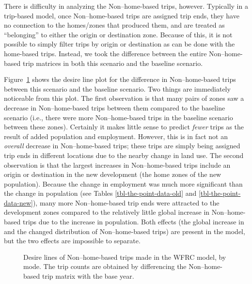 \documentclass[fancy, twoside, mastersfancy, ms]{byuthesis}
\begin{document}
There is difficulty in analyzing the Non--home-based trips, however.
Typically in a trip-based model, once Non--home-based trips are assigned
trip ends, they have no connection to the homes/zones that produced
them, and are treated as ``belonging'' to either the origin or
destination zone. Because of this, it is not possible to simply filter
trips by origin or destination as can be done with the home-based trips.
Instead, we took the difference between the entire Non--home-based trip
matrices in both this scenario and the baseline scenario.

Figure~\ref{fig-lu-desire-cube-nhb} shows the desire line plot for the
difference in Non--home-based trips between this scenario and the
baseline scenario. Two things are immediately noticeable from this plot.
The first observation is that many pairs of zones saw a decrease in
Non--home-based trips between them compared to the baseline scenario
(i.e., there were more Non--home-based trips in the baseline scenario
between these zones). Certainly it makes little sense to predict
\emph{fewer} trips as the result of added population and employment.
However, this is in fact not an \emph{overall} decrease in
Non--home-based trips; these trips are simply being assigned trip ends
in different locations due to the nearby change in land use. The second
observation is that the largest increases in Non--home-based trips
include an origin or destination in the new development (the home zones
of the new population). Because the change in employment was much more
significant than the change in population (see Tables
\ref{tbl-the-point-data-old} and \ref{tbl-the-point-data-new}), many
more Non--home-based trip ends were attracted to the development zones
compared to the relatively little global increase in Non--home-based
trips due to the increase in population. Both effects (the global
increase in and the changed distribution of Non--home-based trips) are
present in the model, but the two effects are impossible to separate.

\begin{figure}


\caption[Desire lines of Non--home-based trips made in the WFRC
model.]{\label{fig-lu-desire-cube-nhb}Desire lines of Non--home-based
trips made in the WFRC model, by mode. The trip counts are obtained by
differencing the Non--home-based trip matrix with the base year.}

\end{figure}%
\end{document}
